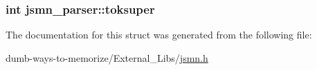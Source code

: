 \subsubsection[{\texorpdfstring{toksuper}{toksuper}}]{\setlength{\rightskip}{0pt plus 5cm}int jsmn\+\_\+parser\+::toksuper}\hypertarget{structjsmn__parser_af11fcec48d9f1298909777a12f1d1e39}{}\label{structjsmn__parser_af11fcec48d9f1298909777a12f1d1e39}


The documentation for this struct was generated from the following file\+:\begin{DoxyCompactItemize}
\item 
dumb-\/ways-\/to-\/memorize/\+External\+\_\+\+Libs/\hyperlink{jsmn_8h}{jsmn.\+h}\end{DoxyCompactItemize}
